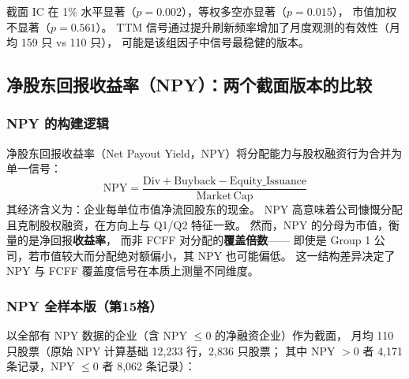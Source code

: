 \documentclass[a4paper,10pt]{article}
\begin{document}
截面 IC 在 1\% 水平显著（$p=0.002$），等权多空亦显著（$p=0.015$），
市值加权不显著（$p=0.561$）。
TTM 信号通过提升刷新频率增加了月度观测的有效性（月均 159 只 vs 110 只），
可能是该组因子中信号最稳健的版本。

\subsection{净股东回报收益率（NPY）：两个截面版本的比较}

\subsubsection{NPY 的构建逻辑}

净股东回报收益率（Net Payout Yield，NPY）将分配能力与股权融资行为合并为单一信号：
\[
    \mathrm{NPY} = \frac{\mathrm{Div} + \mathrm{Buyback} - \mathrm{Equity\_Issuance}}{\mathrm{Market\,Cap}}
\]
其经济含义为：企业每单位市值净流回股东的现金。
NPY 高意味着公司慷慨分配且克制股权融资，在方向上与 Q1/Q2 特征一致。
然而，NPY 的分母为市值，衡量的是净回报\textbf{收益率}，
而非 FCFF 对分配的\textbf{覆盖倍数}——
即使是 Group 1 公司，若市值较大而分配绝对额偏小，其 NPY 也可能偏低。
这一结构差异决定了 NPY 与 FCFF 覆盖度信号在本质上测量不同维度。

\subsubsection{NPY 全样本版（第15格）}

以全部有 NPY 数据的企业（含 NPY $\leq 0$ 的净融资企业）作为截面，
月均 110 只股票（原始 NPY 计算基础 12,233 行，2,836 只股票；
其中 NPY $> 0$ 者 4,171 条记录，NPY $\leq 0$ 者 8,062 条记录）：
\end{document}
